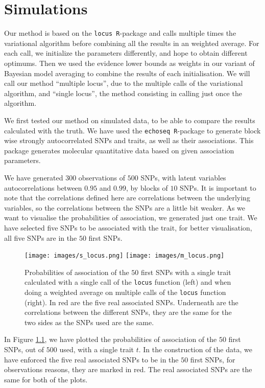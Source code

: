 \documentclass[a4paper, 11pt]{report}
\numberwithin{equation}{chapter}
\begin{document}
\newpage
\chapter{Simulations}
Our method is based on the \texttt{locus R}-package \cite{r_locus} and calls multiple times the variational algorithm before combining all the results in an weighted average. For each call, we initialize the parameters differently, and hope to obtain different optimums. Then we used the evidence lower bounds as weights in our variant of Bayesian model averaging to combine the results of each initialisation. We will call our method ``multiple locus'', due to the multiple calls of the variational algorithm, and ``single locus'', the method consisting in calling just once the algorithm.

We first tested our method on simulated data, to be able to compare the results calculated with the truth. We have used the \texttt{echoseq R}-package \cite{r_echoseq} to generate block wise strongly autocorrelated SNPs and traits, as well as their associations. This package generates molecular quantitative data based on given association parameters. 

We have generated $300$ observations of $500$ SNPs, with latent variables autocorrelations between $0.95$ and $0.99$, by blocks of $10$ SNPs. It is important to note that the correlations defined here are correlations between the underlying variables, so the correlations between the SNPs are a little bit weaker. As we want to visualise the probabilities of association, we generated just one trait. We have selected five SNPs to be associated with the trait, for better visualisation, all five SNPs are in the $50$ first SNPs.


\begin{figure}[h]
\texttt{[image: images/s\_locus.png]}
\texttt{[image: images/m\_locus.png]}
\caption{\label{fig:simple_locus}Probabilities of association of the $50$ first SNPs with a single trait calculated with a single call of the \texttt{locus} function (left) and when doing a weighted average on multiple calls of the \texttt{locus} function (right). In red are the five real associated SNPs. Underneath are the correlations between the different SNPs, they are the same for the two sides as the SNPs used are the same.}
\end{figure}

In Figure \ref{fig:simple_locus}, we have plotted the probabilities of association of the $50$ first SNPs, out of $500$ used, with a single trait $t$. In the construction of the data, we have enforced the five real associated SNPs to be in the $50$ first SNPs, for observations reasons, they are marked in red. The real associated SNPs are the same for both of the plots.
\end{document}
